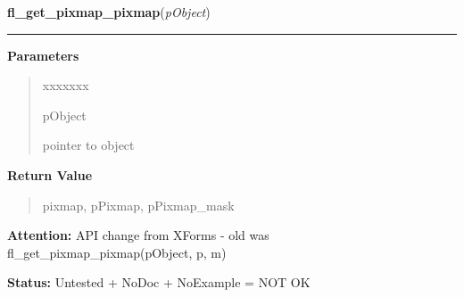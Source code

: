 \hspace{.8\funcindent}\begin{boxedminipage}{\funcwidth}

    \raggedright \textbf{fl\_get\_pixmap\_pixmap}(\textit{pObject})

    \vspace{-1.5ex}

    \rule{\textwidth}{0.5\fboxrule}
\setlength{\parskip}{2ex}
\setlength{\parskip}{1ex}
      \textbf{Parameters}
      \vspace{-1ex}

      \begin{quote}
        \begin{Ventry}{xxxxxxx}

          \item[pObject]

          pointer to object

        \end{Ventry}

      \end{quote}

      \textbf{Return Value}
    \vspace{-1ex}

      \begin{quote}
      pixmap, pPixmap, pPixmap\_mask

      \end{quote}

\textbf{Attention:} API change from XForms - old was fl\_get\_pixmap\_pixmap(pObject, p, m)



\textbf{Status:} Untested + NoDoc + NoExample = NOT OK



    \end{boxedminipage}

    \label{xformslib:library:fl_read_pixmapfile}

    \vspace{0.5ex}

